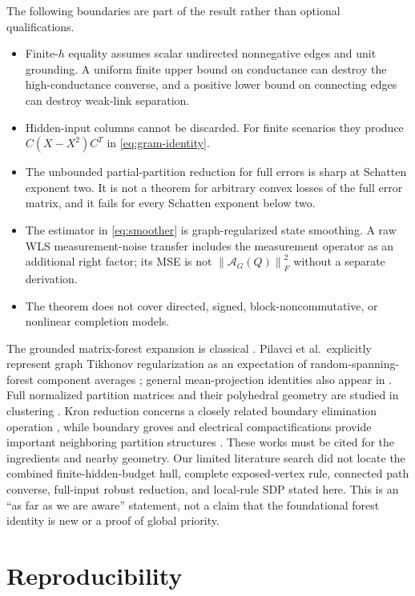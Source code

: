 \documentclass[11pt]{article}
\theoremstyle{definition}
\theoremstyle{remark}
\newcommand{\cA}{\mathcal A}
\newcommand{\norm}[1]{\left\lVert #1\right\rVert}
\begin{document}
The following boundaries are part of the result rather than optional
qualifications.

\begin{itemize}[leftmargin=1.5em]
\item Finite-$h$ equality assumes scalar undirected nonnegative edges and unit
grounding.  A uniform finite upper bound on conductance can destroy the
high-conductance converse, and a positive lower bound on connecting edges can
destroy weak-link separation.
\item Hidden-input columns cannot be discarded.  For finite scenarios they
produce $C(X-X^2)C^T$ in \eqref{eq:gram-identity}.
\item The unbounded partial-partition reduction for full errors is sharp at
Schatten exponent two.  It is not a theorem for arbitrary convex losses of the
full error matrix, and it fails for every Schatten exponent below two.
\item The estimator in \eqref{eq:smoother} is graph-regularized state
smoothing.  A raw WLS measurement-noise transfer includes the measurement
operator as an additional right factor; its MSE is not
$\norm{\cA_G(Q)}_F^2$ without a separate derivation.
\item The theorem does not cover directed, signed, block-noncommutative, or
nonlinear completion models.
\end{itemize}

The grounded matrix-forest expansion is classical
\cite{chebotarev1997}.  Pilavci et al.\ explicitly represent graph Tikhonov
regularization as an expectation of random-spanning-forest component averages
\cite{pilavci2021}; general mean-projection identities also appear in
\cite{derezinski2020,kassel2023}.  Full normalized partition matrices and
their polyhedral geometry are studied in clustering
\cite{derosa2022}.  Kron reduction concerns a closely related boundary
elimination operation \cite{dorfler2013}, while boundary groves and electrical
compactifications provide important neighboring partition structures
\cite{kenyon2011,lam2018}.  These works must be cited for the ingredients and
nearby geometry.  Our limited literature search did not locate the combined
finite-hidden-budget hull, complete exposed-vertex rule, connected path
converse, full-input robust reduction, and local-rule SDP stated here.  This is
an ``as far as we are aware'' statement, not a claim that the foundational
forest identity is new or a proof of global priority.

\section{Reproducibility}
\end{document}
